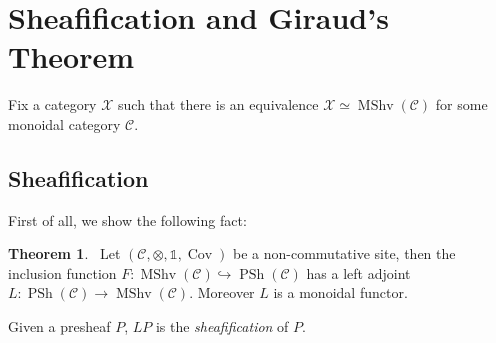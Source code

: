 \documentclass[8pt]{article}
\theoremstyle{definition}
\theoremstyle{definition}
\newtheorem{theorem}{Theorem}[section]
\theoremstyle{definition}
\theoremstyle{definition}
\theoremstyle{definition}
\theoremstyle{definition}
\theoremstyle{definition}
\theoremstyle{definition}
\theoremstyle{definition}
\theoremstyle{definition}
\theoremstyle{definition}
\theoremstyle{definition}
\theoremstyle{definition}
\theoremstyle{question}
\begin{document}
\section{Sheafification and Giraud's Theorem}

Fix a category $\mathcal{X}$ such that there is an equivalence $\mathcal{X} \simeq \operatorname{MShv}(\mathcal{C})$
for some monoidal category $\mathcal{C}$.

\subsection{Sheafification}

First of all, we show the following fact:
\begin{theorem}~\label{adjoint}
  Let $(\mathcal{C}, \otimes, \mathds{1}, \operatorname{Cov})$ be a non-commutative site,
  then the inclusion function $F : \operatorname{MShv}(\mathcal{C}) \hookrightarrow \operatorname{PSh}(\mathcal{C})$
  has a left adjoint $L : \operatorname{PSh}(\mathcal{C}) \to \operatorname{MShv}(\mathcal{C})$.
  Moreover $L$ is a monoidal functor.
\end{theorem}

Given a presheaf $P$, $L P$ is the \emph{sheafification} of $P$.
\end{document}

